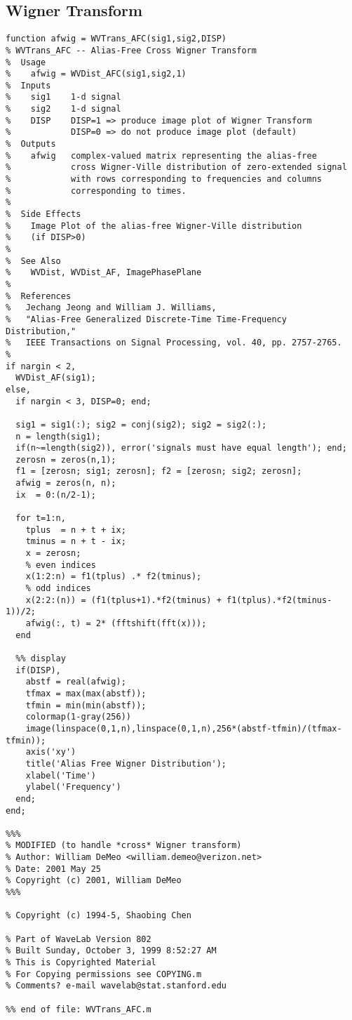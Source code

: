 \subsection{Wigner Transform}\label{sec:WVTrans_AFC}
\begin{small}\begin{verbatim}
function afwig = WVTrans_AFC(sig1,sig2,DISP)
% WVTrans_AFC -- Alias-Free Cross Wigner Transform
%  Usage
%    afwig = WVDist_AFC(sig1,sig2,1)
%  Inputs
%    sig1    1-d signal
%    sig2    1-d signal
%    DISP    DISP=1 => produce image plot of Wigner Transform
%            DISP=0 => do not produce image plot (default)
%  Outputs
%    afwig   complex-valued matrix representing the alias-free
%            cross Wigner-Ville distribution of zero-extended signal
%            with rows corresponding to frequencies and columns
%            corresponding to times.
%
%  Side Effects
%    Image Plot of the alias-free Wigner-Ville distribution 
%    (if DISP>0)
%
%  See Also
%    WVDist, WVDist_AF, ImagePhasePlane
%
%  References
%   Jechang Jeong and William J. Williams,
%   "Alias-Free Generalized Discrete-Time Time-Frequency Distribution,"
%   IEEE Transactions on Signal Processing, vol. 40, pp. 2757-2765.
%
if nargin < 2,
  WVDist_AF(sig1); 
else,
  if nargin < 3, DISP=0; end;
  
  sig1 = sig1(:); sig2 = conj(sig2); sig2 = sig2(:);
  n = length(sig1);
  if(n~=length(sig2)), error('signals must have equal length'); end;
  zerosn = zeros(n,1);
  f1 = [zerosn; sig1; zerosn]; f2 = [zerosn; sig2; zerosn];
  afwig = zeros(n, n);
  ix  = 0:(n/2-1);
  
  for t=1:n,
    tplus  = n + t + ix;
    tminus = n + t - ix;
    x = zerosn;
    % even indices
    x(1:2:n) = f1(tplus) .* f2(tminus); 
    % odd indices    
    x(2:2:(n)) = (f1(tplus+1).*f2(tminus) + f1(tplus).*f2(tminus-1))/2; 
    afwig(:, t) = 2* (fftshift(fft(x)));
  end

  %% display
  if(DISP),
    abstf = real(afwig);
    tfmax = max(max(abstf));
    tfmin = min(min(abstf));
    colormap(1-gray(256))
    image(linspace(0,1,n),linspace(0,1,n),256*(abstf-tfmin)/(tfmax-tfmin));
    axis('xy')
    title('Alias Free Wigner Distribution');
    xlabel('Time')
    ylabel('Frequency')
  end;
end;

%%% 
% MODIFIED (to handle *cross* Wigner transform)
% Author: William DeMeo <william.demeo@verizon.net>
% Date: 2001 May 25
% Copyright (c) 2001, William DeMeo
%%%

% Copyright (c) 1994-5, Shaobing Chen

% Part of WaveLab Version 802
% Built Sunday, October 3, 1999 8:52:27 AM
% This is Copyrighted Material
% For Copying permissions see COPYING.m
% Comments? e-mail wavelab@stat.stanford.edu

%% end of file: WVTrans_AFC.m
\end{verbatim}   \end{small}

